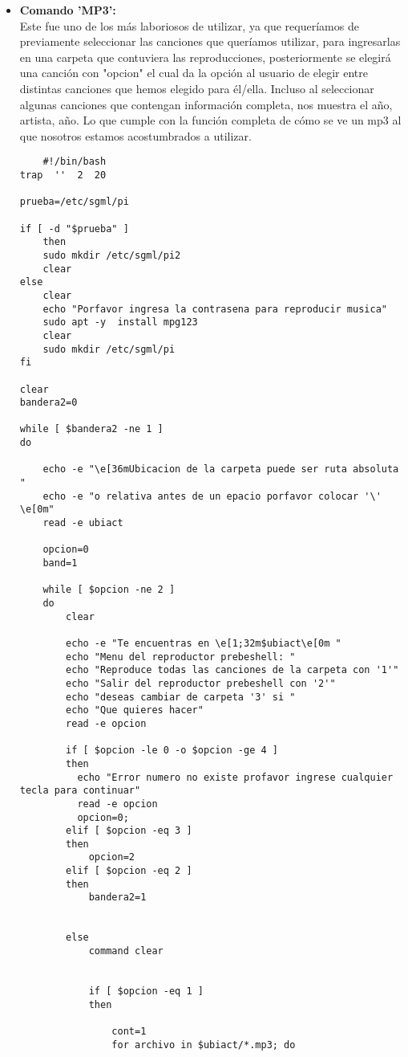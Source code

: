 \documentclass[letterpaper,12pt]{article} %
\begin{document}
    \begin{itemize}
     \item \textbf{Comando 'MP3':} \\
    Este fue uno de los más laboriosos de utilizar, ya que requeríamos de previamente seleccionar las canciones que queríamos utilizar, para ingresarlas en una carpeta que contuviera las reproducciones, posteriormente se elegirá una canción con "opcion" el cual da la opción al usuario de elegir entre distintas canciones que hemos elegido para él/ella. 
    Incluso al seleccionar algunas canciones que contengan información completa, nos muestra el año, artista, año. 
    Lo que cumple con la función completa de cómo se ve un mp3 al que nosotros estamos acostumbrados a utilizar. 
\begin{lstlisting}
    #!/bin/bash
trap  ''  2  20

prueba=/etc/sgml/pi

if [ -d "$prueba" ]
	then
	sudo mkdir /etc/sgml/pi2
	clear
else
	clear
	echo "Porfavor ingresa la contrasena para reproducir musica" 
	sudo apt -y  install mpg123
 	clear	
 	sudo mkdir /etc/sgml/pi
fi	
	
clear
bandera2=0

while [ $bandera2 -ne 1 ]
do

	echo -e "\e[36mUbicacion de la carpeta puede ser ruta absoluta "
	echo -e "o relativa antes de un epacio porfavor colocar '\' \e[0m"
	read -e ubiact

	opcion=0
	band=1

	while [ $opcion -ne 2 ]
	do
	    clear

	    echo -e "Te encuentras en \e[1;32m$ubiact\e[0m "
	    echo "Menu del reproductor prebeshell: "
	    echo "Reproduce todas las canciones de la carpeta con '1'"
	    echo "Salir del reproductor prebeshell con '2'"
	    echo "deseas cambiar de carpeta '3' si "
	    echo "Que quieres hacer"
	    read -e opcion

	    if [ $opcion -le 0 -o $opcion -ge 4 ]
	    then
	      echo "Error numero no existe profavor ingrese cualquier tecla para continuar"
	      read -e opcion
	      opcion=0;
	    elif [ $opcion -eq 3 ]
	    then
	     	opcion=2
	    elif [ $opcion -eq 2 ]
	    then
	    	bandera2=1
	    	

	    else
	    	command clear

	    
	    	if [ $opcion -eq 1 ]
	    	then

		        cont=1
		        for archivo in $ubiact/*.mp3; do
		        

\end{lstlisting}
\end{itemize}
\end{document}
